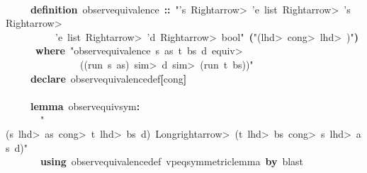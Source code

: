 \documentclass{article}
\newcommand{\syntaxKEYWORDA}[1]{\textcolor[rgb]{0.0,0.4,0.6}{\textbf{#1}}}
\newcommand{\syntaxKEYWORDB}[1]{\textcolor[rgb]{0.0,0.6,0.4}{\textbf{#1}}}
\newcommand{\syntaxLITERALA}[1]{\textcolor[rgb]{1.0,0.0,0.8}{#1}}
\newcommand{\syntaxOPERATOR}[1]{\textcolor[rgb]{0.0,0.0,0.0}{\textbf{#1}}}
\newcommand{\syntaxKEYWORDA}[1]{\textcolor[rgb]{0.0,0.4,0.6}{\textbf{#1}}}
\newcommand{\syntaxKEYWORDB}[1]{\textcolor[rgb]{0.0,0.6,0.4}{\textbf{#1}}}
\newcommand{\syntaxLITERALA}[1]{\textcolor[rgb]{1.0,0.0,0.8}{#1}}
\newcommand{\syntaxOPERATOR}[1]{\textcolor[rgb]{0.0,0.0,0.0}{\textbf{#1}}}
\newcommand{\syntaxKEYWORDA}[1]{\textcolor[rgb]{0.0,0.4,0.6}{\textbf{#1}}}
\newcommand{\syntaxKEYWORDB}[1]{\textcolor[rgb]{0.0,0.6,0.4}{\textbf{#1}}}
\newcommand{\syntaxLITERALA}[1]{\textcolor[rgb]{1.0,0.0,0.8}{#1}}
\newcommand{\syntaxOPERATOR}[1]{\textcolor[rgb]{0.0,0.0,0.0}{\textbf{#1}}}
\newcommand{\syntaxKEYWORDA}[1]{\textcolor[rgb]{0.0,0.4,0.6}{#1}}
\newcommand{\syntaxKEYWORDB}[1]{\textcolor[rgb]{0.0,0.6,0.4}{#1}}
\newcommand{\syntaxLITERALA}[1]{\textcolor[rgb]{1.0,0.0,0.8}{\textbf{#1}}}
\newcommand{\syntaxOPERATOR}[1]{\textcolor[rgb]{0.0,0.0,0.0}{#1}}
\newcommand{\syntaxKEYWORDA}[1]{\textcolor[rgb]{0.0,0.4,0.6}{\textbf{#1}}}
\newcommand{\syntaxKEYWORDB}[1]{\textcolor[rgb]{0.0,0.6,0.4}{\textbf{#1}}}
\newcommand{\syntaxLITERALA}[1]{\textcolor[rgb]{1.0,0.0,0.8}{#1}}
\newcommand{\syntaxOPERATOR}[1]{\textcolor[rgb]{0.0,0.0,0.0}{\textbf{#1}}}
\newcommand{\syntaxKEYWORDA}[1]{\textcolor[rgb]{0.0,0.4,0.6}{\textbf{#1}}}
\newcommand{\syntaxKEYWORDB}[1]{\textcolor[rgb]{0.0,0.6,0.4}{\textbf{#1}}}
\newcommand{\syntaxLITERALA}[1]{\textcolor[rgb]{1.0,0.0,0.8}{#1}}
\newcommand{\syntaxOPERATOR}[1]{\textcolor[rgb]{0.0,0.0,0.0}{\textbf{#1}}}
\begin{document}
\hspace*{\fill}\\
{\ }{\ }{\ }{\ }{\ }\syntaxKEYWORDA{definition}{\ }observ\usebox{\underscorebox}equivalence{\ }\syntaxOPERATOR{::}{\ }\syntaxLITERALA{"'s{\ }\<Rightarrow>{\ }'e{\ }list{\ }\<Rightarrow>{\ }'s{\ }\<Rightarrow>{\ }}\hspace*{\fill}\\
\syntaxLITERALA{{\ }{\ }{\ }{\ }{\ }{\ }{\ }{\ }{\ }{\ }'e{\ }list{\ }\<Rightarrow>{\ }'d{\ }\<Rightarrow>{\ }bool"}{\ }\syntaxOPERATOR{(}\syntaxLITERALA{"(\usebox{\underscorebox}{\ }\<lhd>{\ }\usebox{\underscorebox}{\ }\<cong>{\ }\usebox{\underscorebox}{\ }\<lhd>{\ }\usebox{\underscorebox}{\ }\usebox{\atbox}{\ }\usebox{\underscorebox})"}\syntaxOPERATOR{)}\hspace*{\fill}\\
{\ }{\ }{\ }{\ }{\ }{\ }\syntaxKEYWORDB{where}{\ }\syntaxLITERALA{"observ\usebox{\underscorebox}equivalence{\ }s{\ }as{\ }t{\ }bs{\ }d{\ }\<equiv>{\ }}\hspace*{\fill}\\
\syntaxLITERALA{{\ }{\ }{\ }{\ }{\ }{\ }{\ }{\ }{\ }{\ }{\ }{\ }{\ }{\ }{\ }((run{\ }s{\ }as){\ }\<sim>{\ }d{\ }\<sim>{\ }(run{\ }t{\ }bs))"}\hspace*{\fill}\\
{\ }{\ }{\ }{\ }{\ }\syntaxKEYWORDA{declare}{\ }observ\usebox{\underscorebox}equivalence\usebox{\underscorebox}def\syntaxOPERATOR{{[}}cong\syntaxOPERATOR{{]}}\hspace*{\fill}\\
\hspace*{\fill}\\
{\ }{\ }{\ }{\ }{\ }\syntaxKEYWORDA{lemma}{\ }observ\usebox{\underscorebox}equiv\usebox{\underscorebox}sym\syntaxOPERATOR{:}\hspace*{\fill}\\
{\ }{\ }{\ }{\ }{\ }{\ }{\ }\syntaxLITERALA{"(s{\ }\<lhd>{\ }as{\ }\<cong>{\ }t{\ }\<lhd>{\ }bs{\ }\usebox{\atbox}{\ }d){\ }\<Longrightarrow>{\ }(t{\ }\<lhd>{\ }bs{\ }\<cong>{\ }s{\ }\<lhd>{\ }as{\ }\usebox{\atbox}{\ }d)"}\hspace*{\fill}\\
{\ }{\ }{\ }{\ }{\ }{\ }{\ }\syntaxKEYWORDA{using}{\ }observ\usebox{\underscorebox}equivalence\usebox{\underscorebox}def{\ }vpeq\usebox{\underscorebox}symmetric\usebox{\underscorebox}lemma{\ }\syntaxKEYWORDA{by}{\ }blast\hspace*{\fill}\\
\hspace*{\fill}\\
\end{document}
